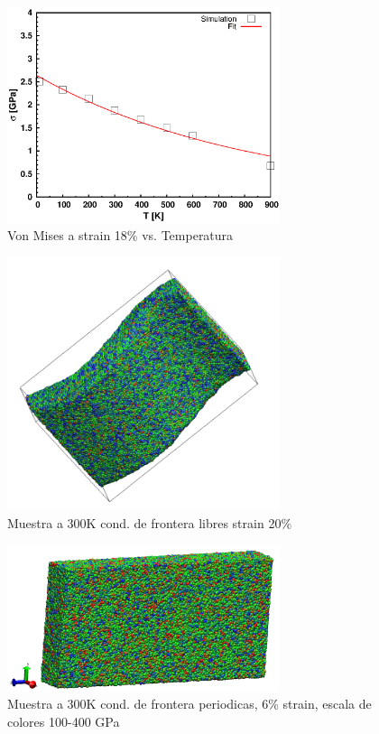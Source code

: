 \documentclass[10pt, oneside]{article} %
\begin{document}
\begin{figure}[H]
\centering
\includegraphics[width=8cm]{Figures/18stress_T_COMP.eps}
\caption{Von Mises a strain 18\% vs. Temperatura}
\end{figure}

\begin{figure}[H]
\centering
\includegraphics[width=8cm]{Figures/300libresComp.png}
\caption{Muestra a 300K cond. de frontera libres strain 20\%}
\end{figure}

\begin{figure}[H]
\centering
\includegraphics[width=8cm]{Figures/All_300K_6pstrain_sacale100-400_Comp.png}
\caption{Muestra a 300K cond. de frontera periodicas, 6\% strain, escala de colores 100-400 GPa}
\end{figure}
\end{document}
